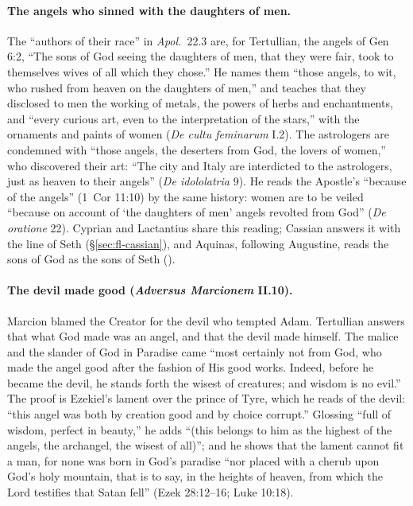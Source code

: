 \paragraph{The angels who sinned with the daughters of men.} The
``authors of their race'' in \emph{Apol.}\ 22.3 are, for Tertullian, the
angels of Gen 6:2, ``The sons of God seeing the daughters of men, that
they were fair, took to themselves wives of all which they chose.'' He
names them ``those angels, to wit, who rushed from heaven on the daughters
of men,'' and teaches that they disclosed to men the working of metals,
the powers of herbs and enchantments, and ``every curious art, even to the
interpretation of the stars,'' with the ornaments and paints of women
(\emph{De cultu feminarum} I.2). The astrologers are condemned with ``those
angels, the deserters from God, the lovers of women,'' who discovered
their art: ``The city and Italy are interdicted to the astrologers, just
as heaven to their angels'' (\emph{De idololatria} 9). He reads the
Apostle's ``because of the angels'' (1~Cor 11:10) by the same history:
women are to be veiled ``because on account of `the daughters of men'
angels revolted from God'' (\emph{De oratione} 22). Cyprian and Lactantius
share this reading; Cassian answers it with the line of Seth
(\S\ref{sec:fl-cassian}), and Aquinas, following Augustine, reads the sons of
God as the sons of Seth ().

\paragraph{The devil made good (\emph{Adversus Marcionem} II.10).} Marcion
blamed the Creator for the devil who tempted Adam. Tertullian answers
that what God made was an angel, and that the devil made himself. The
malice and the slander of God in Paradise came ``most certainly not from
God, who made the angel good after the fashion of His good works. Indeed,
before he became the devil, he stands forth the wisest of creatures; and
wisdom is no evil.'' The proof is Ezekiel's lament over the prince of
Tyre, which he reads of the devil: ``this angel was both by creation good
and by choice corrupt.'' Glossing ``full of wisdom, perfect in beauty,''
he adds ``(this belongs to him as the highest of the angels, the
archangel, the wisest of all)''; and he shows that the lament cannot fit a
man, for none was born in God's paradise ``nor placed with a cherub upon
God's holy mountain, that is to say, in the heights of heaven, from which
the Lord testifies that Satan fell'' (Ezek 28:12--16; Luke 10:18).

